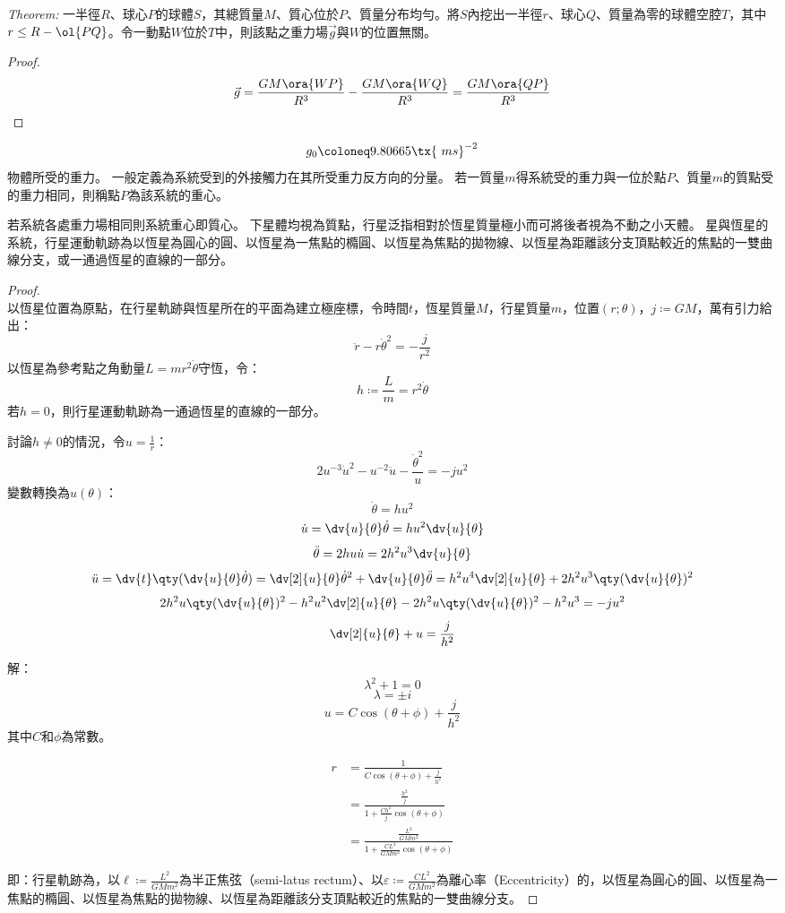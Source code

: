 \documentclass[a4paper,12pt]{article}
\begin{document}
\textit{Theorem:} 一半徑$R$、球心$P$的球體$S$，其總質量$M$、質心位於$P$、質量分布均勻。將$S$內挖出一半徑$r$、球心$Q$、質量為零的球體空腔$T$，其中$r\leq R-\ol{PQ}$。令一動點$W$位於$T$中，則該點之重力場$\vec{g}$與$W$的位置無關。
\begin{proof}
\[\vec{g}=\frac{GM\ora{WP}}{R^3}-\frac{GM\ora{WQ}}{R^3}=\frac{GM\ora{QP}}{R^3}\]
\end{proof}
\[g_0\coloneq 9.80665 \tx{\ m s}^{-2}\]
物體所受的重力。
一般定義為系統受到的外接觸力在其所受重力反方向的分量。
若一質量$m$得系統受的重力與一位於點$P$、質量$m$的質點受的重力相同，則稱點$P$為該系統的重心。

若系統各處重力場相同則系統重心即質心。
下星體均視為質點，行星泛指相對於恆星質量極小而可將後者視為不動之小天體。
星與恆星的系統，行星運動軌跡為以恆星為圓心的圓、以恆星為一焦點的橢圓、以恆星為焦點的拋物線、以恆星為距離該分支頂點較近的焦點的一雙曲線分支，或一通過恆星的直線的一部分。
\begin{proof}\mbox{}\\
以恆星位置為原點，在行星軌跡與恆星所在的平面為建立極座標，令時間$t$，恆星質量$M$，行星質量$m$，位置$(r;\theta)$，$j\coloneq GM$，萬有引力給出：
\[\ddot{r}-r\dot{\theta}^2=-\frac{j}{r^2}\]
以恆星為參考點之角動量$L=mr^2\dot{\theta}$守恆，令：
\[h\coloneq\frac{L}{m}=r^2\dot{\theta}\]
若$h=0$，則行星運動軌跡為一通過恆星的直線的一部分。

討論$h\neq0$的情況，令$u=\frac{1}{r}$：
\[2u^{-3}\dot{u}^2-u^{-2}\ddot{u}-\frac{\dot{\theta}^2}{u}=-ju^2\]
變數轉換為$u(\theta)$：
\[\dot{\theta}=h u^2\]
\[\dot{u}=\dv{u}{\theta}\dot{\theta}=h u^2\dv{u}{\theta}\]
\[\ddot{\theta}=2h u\dot{u}=2h^2u^3\dv{u}{\theta}\]
\[\ddot{u}=\dv{t}\qty(\dv{u}{\theta}\dot{\theta})=\dv[2]{u}{\theta}\dot{\theta}^2+\dv{u}{\theta}\ddot{\theta}=h^2u^4\dv[2]{u}{\theta}+2h^2u^3\qty(\dv{u}{\theta})^2\]
\[2h^2u\qty(\dv{u}{\theta})^2-h^2u^2\dv[2]{u}{\theta}-2h^2u\qty(\dv{u}{\theta})^2-h^2u^3=-ju^2\]
\[\dv[2]{u}{\theta}+u=\frac{j}{h^2}\]

解：
\[\lambda^2+1=0\]
\[\lambda=\pm i\]
\[u=C\cos(\theta+\phi)+\frac{j}{h^2}\]
其中$C$和$\phi$為常數。

\[\begin{aligned}
r&=\frac{1}{C\cos(\theta+\phi)+\frac{j}{h^2}}\\
&=\frac{\frac{h^2}{j}}{1+\frac{Ch^2}{j}\cos(\theta+\phi)}\\
&=\frac{\frac{L^2}{GMm^2}}{1+\frac{CL^2}{GMm^2}\cos(\theta+\phi)}
\end{aligned}\]

即：行星軌跡為，以$\ell\coloneq \frac{L^2}{GMm^2}$為半正焦弦（semi-latus rectum）、以$\varepsilon\coloneq \frac{CL^2}{GMm^2}$為離心率（Eccentricity）的，以恆星為圓心的圓、以恆星為一焦點的橢圓、以恆星為焦點的拋物線、以恆星為距離該分支頂點較近的焦點的一雙曲線分支。
\end{proof}
\end{document}
